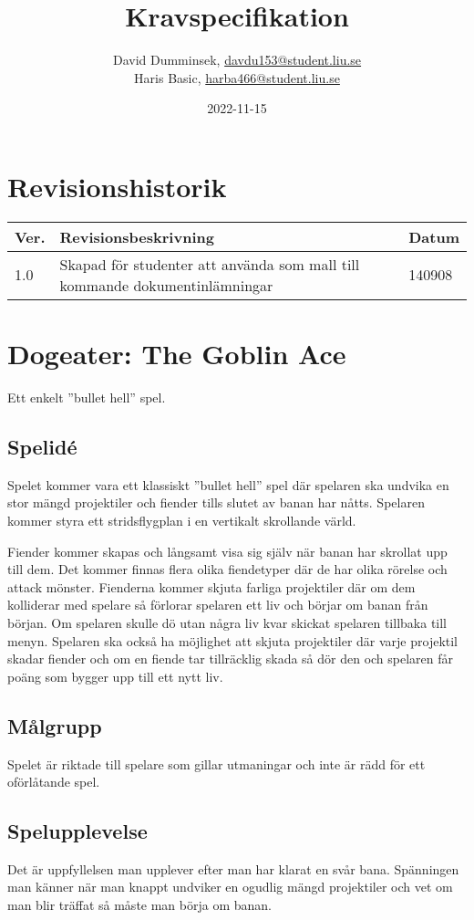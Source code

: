 \documentclass{TDP005mall}
\author{David Dumminsek, \url{davdu153@student.liu.se}\\
  Haris Basic, \url{harba466@student.liu.se}\\
  }
\title{Kravspecifikation}
\date{2022-11-15}
\begin{document}
\projectpage
\section{Revisionshistorik}
\begin{table}[!h]
\begin{tabularx}{\linewidth}{|l|X|l|}
\hline
Ver. & Revisionsbeskrivning & Datum \\\hline
1.0 & Skapad för studenter att använda som mall till
kommande dokumentinlämningar & 140908 \\\hline
\end{tabularx}
\end{table}

\section{Dogeater: The Goblin Ace}
Ett enkelt ''bullet hell'' spel.
\subsection{Spelidé}
Spelet kommer vara ett klassiskt ''bullet hell'' spel där spelaren ska undvika en stor mängd projektiler och fiender tills slutet av banan har nåtts. 
Spelaren kommer styra ett stridsflygplan i en vertikalt skrollande värld.

Fiender kommer skapas och långsamt visa sig själv när banan 
har skrollat upp till dem. Det kommer finnas flera olika fiendetyper där de har olika rörelse och attack mönster. 
Fienderna kommer skjuta farliga projektiler där om dem kolliderar med spelare så förlorar spelaren ett liv och börjar om banan från början.
Om spelaren skulle dö utan några liv kvar skickat spelaren tillbaka till menyn. 
Spelaren ska också ha möjlighet att skjuta projektiler där varje projektil skadar fiender och om en fiende tar tillräcklig skada så dör den
och spelaren får poäng som bygger upp till ett nytt liv.

\subsection{Målgrupp}
Spelet är riktade till spelare som gillar utmaningar och inte är rädd för ett oförlåtande spel.
\subsection{Spelupplevelse}
Det är uppfyllelsen man upplever efter man har klarat en svår bana. 
Spänningen man känner när man knappt undviker en ogudlig mängd projektiler och vet om man 
blir träffat så måste man börja om banan.
\end{document}
